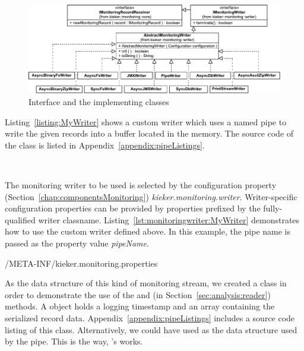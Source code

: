 \begin{figure}[H]
\begin{centering}
\includegraphics[scale=0.7]{images/kieker_writerimplsuserguide-modified}
\caption{Interface  and  the implementing classes}
\label{figure:monitoringLogWritersHierarchy}
\end{centering}
\end{figure}

\noindent Listing~\ref{listing:MyWriter} %
shows %
a custom writer  which uses a named pipe to %
write the given records into a buffer located in the memory. The source code of %
the class  is listed in Appendix~\ref{appendix:pipeListings}. %

\enlargethispage{1cm}

\

\setJavaCodeListing


\noindent The monitoring writer to be used is selected by the %
\KiekerMonitoringPart{} configuration property (Section~\ref{chap:componentsMonitoring}) %
\textit{kieker.monitoring.writer}. Writer-specific configuration properties %
can be provided by properties prefixed by the fully-qualified writer classname.  %
Listing~\ref{lst:monitoringwriter:MyWriter} demonstrates how to use the custom %
writer  defined above. In this example, the pipe name is %
passed as the property value \textit{pipeName}.

\setPropertiesListing
%
{\customComponentsBookstoreApplicationDir/META-INF/kieker.monitoring.properties}

\enlargethispage{1cm}

\noindent As the data structure of this kind of monitoring stream, we created a %
class  in order to demonstrate the use of the  and %
 (in Section~\ref{sec:analysis:reader}) methods. %
A  object holds a logging timestamp and an  array %
containing the serialized record data. %
Appendix~\ref{appendix:pipeListings} includes a source code listing of this class. %
Alternatively, we could have used  as the data structure %
used by the pipe. This is the way, \Kieker{}'s  works. %
